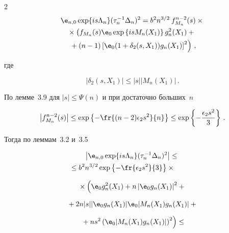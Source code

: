 \begin{multicols}{2}
\begin{multline*}


{\e}_{n,0}\exp\{is\Lambda_n\}(\tau_n^{-1}\Delta_n)^2 = b^2 n^{3/2}\:f_{M_n}^{n-2}(s) \times{}\\


{}


\times \left(f_{M_n}(s) {\e}_0 \exp\left\{isM_n(X_1)\right\} g_n^2(X_1) + {}\right.{}\\


\left.{}+


(n-1) \left[{\e}_0 (1+\delta_2(s,X_1)) g_n(X_1)\right]^2\right)\,,


\end{multline*}


где


$$


|\delta_2(s,X_1)| \leq |s| |M_n(X_1)|\,.


$$


По лемме~3.9 для $|s| \leq \Psi(n)$ и при достаточно больших~$n$


$$


\left|f_{M_n}^{n-2}(s)\right| \leq \exp\left\{


-\fr{(n-2)\epsilon_2 s^2}{n}\right\} 


\leq \exp\left\{-\frac{\epsilon_2 s^2}{3}\right\}\,.


$$


Тогда по леммам~3.2 и~3.5


\begin{multline*}


\left|{\e}_{n,0}\exp\{is\Lambda_n\}(\tau_n^{-1}\Delta_n)^2\right| \leq{}\\


{}\leq b^2 n^{3/2} 


\exp\left\{-\fr{\epsilon_2 s^2}{3}\right\} \times{}\hspace*{10mm}


\end{multline*}


\begin{multline*}


{}\times \left({\e}_0 g_n^2(X_1) + n\left|{\e}_0g_n(X_1)\right|^2 +{}\right.\\[6pt]


{}


+ 2 n |s|  |{\e}_0 g_n(X_1)|  {\e}_0 |M_n(X_1) g_n(X_1)| +{}\\[6pt]


\left.{}+ns^2 \left({\e}_0 |M_n(X_1) g_n(X_1)|\right)^2\right) \leq



\end{multline*}
\end{multicols}
